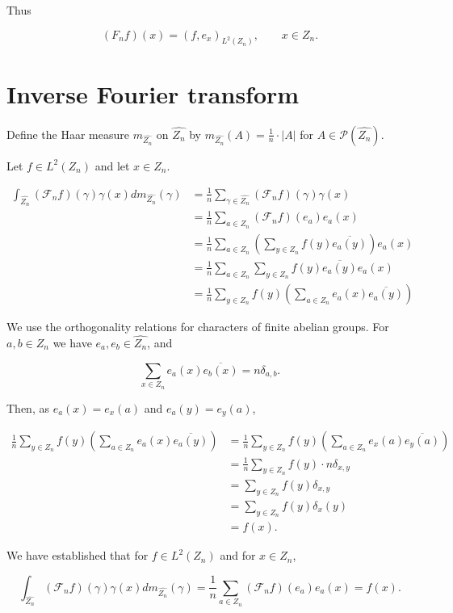 \documentclass[11pt]{article} %
\begin{document}
Thus

$$
(F_n f)(x) = (f,e_x)_{L^2(Z_n)}, \qquad x \in Z_n.
$$

\section{Inverse Fourier transform}

Define the Haar measure $m_{\widehat{Z_n}}$ on $\widehat{Z_n}$ by
$m_{\widehat{Z_n}}(A)=\frac{1}{n} \cdot |A|$ for $A \in \mathscr{P}(\widehat{Z_n})$.

Let $f \in L^2(Z_n)$ and let $x \in Z_n$.

\begin{align*}
\int_{\widehat{Z_n}} (\mathscr{F}_nf)(\gamma) \gamma(x) dm_{\widehat{Z_n}}(\gamma)&=\frac{1}{n} \sum_{\gamma \in \widehat{Z_n}} (\mathscr{F}_nf)(\gamma)\gamma(x)\\
&=\frac{1}{n} \sum_{a \in Z_n} (\mathscr{F}_nf)(e_a)e_a(x)\\
&=\frac{1}{n} \sum_{a \in Z_n} \left(\sum_{y \in Z_n} f(y)\overline{e_a(y)}\right)e_a(x)\\
&=\frac{1}{n} \sum_{a \in Z_n} \sum_{y \in Z_n} f(y) \overline{e_a(y)}e_a(x)\\
&=\frac{1}{n} \sum_{y \in Z_n} f(y) \left(\sum_{a \in Z_n} e_a(x)\overline{e_a(y)}\right)
\end{align*}

We use  the orthogonality relations for characters of finite abelian groups. For $a,b \in Z_n$ we have $e_a,e_b \in \widehat{Z_n}$, and

$$\sum_{x \in Z_n} e_a(x)\overline{e_{b}(x)}= n \delta_{a,b}.$$

Then, as $e_a(x)=e_x(a)$ and $e_a(y)=e_y(a)$,

\begin{align*}
\frac{1}{n} \sum_{y \in Z_n} f(y) \left(\sum_{a \in Z_n} e_a(x)\overline{e_a(y)}\right)&=\frac{1}{n} \sum_{y \in Z_n} f(y) \left(\sum_{a \in Z_n} e_x(a)\overline{e_y(a)}\right)\\
&=\frac{1}{n} \sum_{y \in Z_n} f(y) \cdot n \delta_{x,y}\\
&=\sum_{y \in Z_n} f(y)  \delta_{x,y}\\
&=\sum_{y \in Z_n} f(y)  \delta_x(y)\\
&=f(x).
\end{align*}

We have established that for $f \in L^2(Z_n)$ and for $x \in Z_n$,

$$
\int_{\widehat{Z_n}} (\mathscr{F}_nf)(\gamma) \gamma(x) dm_{\widehat{Z_n}}(\gamma)
= \frac{1}{n} \sum_{a \in Z_n} (\mathscr{F}_nf)(e_a)e_a(x)
=f(x).
$$
\end{document}

